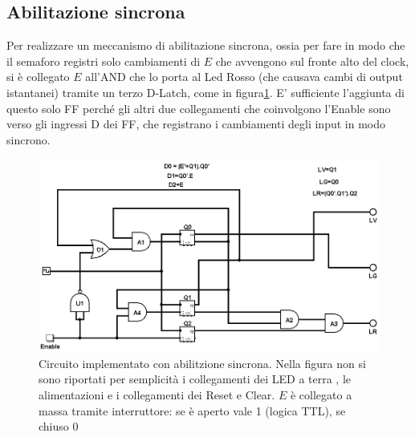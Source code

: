 \documentclass[10pt,a4paper]{article}
\begin{document}
\subsection{Abilitazione sincrona}
Per realizzare un meccanismo di abilitazione sincrona, ossia per fare in modo che il semaforo registri solo cambiamenti di $E$ che avvengono sul fronte alto del clock, si è collegato $E$ all'AND che lo porta al Led Rosso (che causava cambi di output istantanei) tramite un terzo D-Latch, come in figura\ref{fig:circcompletesincrono}.
E' sufficiente l'aggiunta di questo solo FF perché gli altri due collegamenti che coinvolgono l'Enable sono verso gli ingressi D dei FF, che registrano i cambiamenti degli input in modo sincrono.
\begin{figure}[!htb]
\centering
\includegraphics[scale=0.5]{circcompletesincrono.png}
\caption{Circuito implementato con abilitzione sincrona. Nella figura non si sono riportati per semplicità i collegamenti dei LED a terra , le alimentazioni e i collegamenti dei Reset e Clear. $E$ è collegato a massa tramite interruttore: se è aperto vale 1 (logica TTL), se chiuso 0\label{fig:circcompletesincrono}}
\end{figure}

\end{document}
